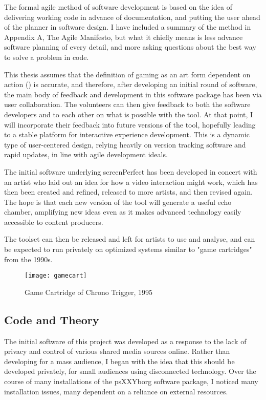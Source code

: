 The formal agile method of software development is based on the idea of delivering working code in advance of documentation, and putting the user ahead of the planner in software design. I have included a summary of the method in Appendix A, The Agile Manifesto, but what it chiefly means is less advance software planning of every detail, and more asking questions about the best way to solve a problem in code. 

This thesis assumes that the definition of gaming as an art form dependent on action (\cite{galloway}) is accurate, and therefore, after developing an initial round of software, the main body of feedback and development in this software package has been via user collaboration. The volunteers can then give feedback to both the software developers and to each other on what is possible with the tool. At that point, I will incorporate their feedback into future versions of the tool, hopefully leading to a stable platform for interactive experience development. This is a dynamic type of user-centered design, relying heavily on version tracking software and rapid updates, in line with agile development ideals.

The initial software underlying screenPerfect has been developed in concert with an artist who laid out an idea for how a video interaction might work, which has then been created and refined, released to more artists, and then revised again. The hope is that each new version of the tool will generate a useful echo chamber, amplifying new ideas even as it makes advanced technology easily accessible to content producers.

The toolset can then be released and left for artists to use and analyse, and can be expected to run privately on optimized systems similar to "game cartridges" from the 1990s. 
\begin{figure}[h!]
 \caption{Game Cartridge of Chrono Trigger, 1995}
  \centering
    \texttt{[image: gamecart]}
\end{figure}

\subsection{Code and Theory}

The initial software of this project was developed as a response to the lack of privacy and control of various shared media sources online. Rather than developing for a mass audience, I began with the idea that this should be developed privately, for small audiences using disconnected technology. Over the course of many installations of the psXXYborg software package, I noticed many installation issues, many dependent on a reliance on external resources.

